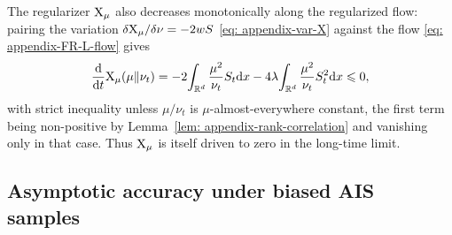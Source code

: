 \documentclass{article}
\begin{document}
\begin{remark}
The regularizer $\mathrm{X}_\mu$ also decreases monotonically along the regularized flow: pairing the variation $\delta\mathrm{X}_\mu/\delta\nu = -2wS$ \eqref{eq: appendix-var-X} against the flow \eqref{eq: appendix-FR-L-flow} gives
\begin{equation*}
    \frac{\mathrm{d}}{\mathrm{d} t}\mathrm{X}_\mu(\mu\|\nu_t) = -2\!\int_{\mathbb R^d}\frac{\mu^2}{\nu_t} S_t \mathrm{d} x - 4\lambda\!\int_{\mathbb R^d}\frac{\mu^2}{\nu_t} S_t^2 \mathrm{d} x  \leqslant  0,
\end{equation*}
with strict inequality unless $\mu/\nu_t$ is $\mu$-almost-everywhere constant, the first term being non-positive by Lemma~\ref{lem: appendix-rank-correlation} and vanishing only in that case. Thus $\mathrm{X}_\mu$ is itself driven to zero in the long-time limit.
\end{remark}

\subsection{Asymptotic accuracy under biased AIS samples}
\label{subsec: appendix-accuracy}
\end{document}
